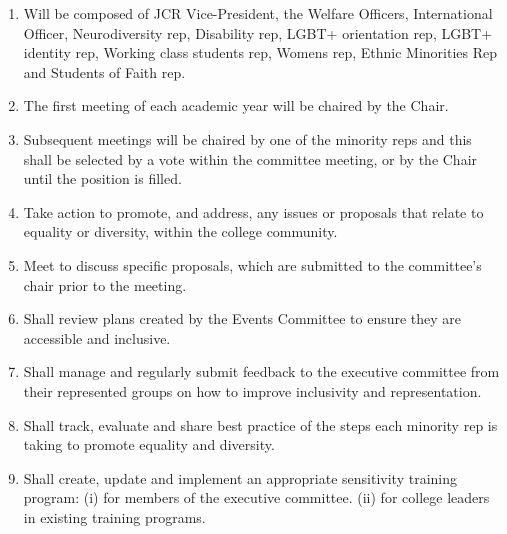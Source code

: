 
\begin{enumerate}
    \item Will be composed of JCR Vice-President, the Welfare Officers, International Officer, Neurodiversity rep, Disability rep, LGBT+ orientation rep, LGBT+ identity rep, Working class students rep, Womens rep, Ethnic Minorities Rep and Students of Faith rep.
    \item The first meeting of each academic year will be chaired by the Chair. 
    \item Subsequent meetings will be chaired by one of the minority reps and this shall be selected by a vote within the committee meeting, or by the Chair until the position is filled. 
    \item Take action to promote, and address, any issues or proposals that relate to equality or diversity, within the college community. 
    \item Meet to discuss specific proposals, which are submitted to the committee’s chair prior to the meeting.
    \item Shall review plans created by the Events Committee to ensure they are accessible and inclusive.
    \item Shall manage and regularly submit feedback to the executive committee from their represented groups on how to improve inclusivity and representation.
    \item Shall track, evaluate and share best practice of the steps each minority rep is taking to promote equality and diversity.
    \item Shall create, update and implement an appropriate sensitivity training program:
(i) for members of the executive committee. 
(ii) for college leaders in existing training programs.

\end{enumerate}


